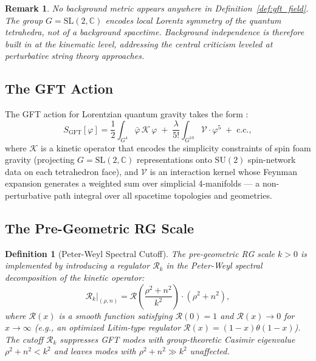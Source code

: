 \documentclass[12pt,a4paper]{article}
\newtheorem{definition}{Definition}
\newtheorem{remark}{Remark}
\newcommand{\GFT}{\mathrm{GFT}}
\newcommand{\Rk}{\mathcal{R}_k}
\begin{document}
\begin{remark}
No background metric appears anywhere in Definition~\ref{def:gft_field}.
The group $G = \mathrm{SL}(2,\mathbb{C})$ encodes local Lorentz symmetry
of the quantum tetrahedra, not of a background spacetime.
Background independence is therefore built in at the kinematic level,
addressing the central criticism leveled at perturbative string theory
approaches.
\end{remark}

\subsection{The GFT Action}

The GFT action for Lorentzian quantum gravity takes the form
\cite{ashtekar2004}:
\begin{equation}
\label{eq:gft_action}
S_\GFT[\varphi] = \frac{1}{2}\int_{G^4} \bar{\varphi}\,\mathcal{K}\,\varphi
\;+\; \frac{\lambda}{5!}\int_{G^{10}}\mathcal{V}\cdot\varphi^5
\;+\; \mathrm{c.c.},
\end{equation}
where $\mathcal{K}$ is a kinetic operator that encodes the simplicity
constraints of spin foam gravity (projecting $G = \mathrm{SL}(2,\mathbb{C})$
representations onto $\mathrm{SU}(2)$ spin-network data on each
tetrahedron face), and $\mathcal{V}$ is an interaction kernel whose
Feynman expansion generates a weighted sum over simplicial
4-manifolds — a non-perturbative path integral over all
spacetime topologies and geometries.

\subsection{The Pre-Geometric RG Scale}

\begin{definition}[Peter-Weyl Spectral Cutoff]
\label{def:rg_scale}
The pre-geometric RG scale $k > 0$ is implemented by introducing a
regulator $\Rk$ in the Peter-Weyl spectral decomposition of the kinetic
operator:
\begin{equation}
\label{eq:regulator}
\Rk\big|_{(\rho,n)} = \mathcal{R}\!\left(\frac{\rho^2 + n^2}{k^2}\right)
\cdot (\rho^2 + n^2),
\end{equation}
where $\mathcal{R}(x)$ is a smooth function satisfying
$\mathcal{R}(0) = 1$ and $\mathcal{R}(x)\to 0$ for $x\to\infty$
(e.g., an optimized Litim-type regulator $\mathcal{R}(x) = (1-x)\theta(1-x)$).
The cutoff $\Rk$ suppresses GFT modes with group-theoretic Casimir
eigenvalue $\rho^2 + n^2 < k^2$ and leaves modes with
$\rho^2 + n^2 \gg k^2$ unaffected.
\end{definition}
\end{document}
